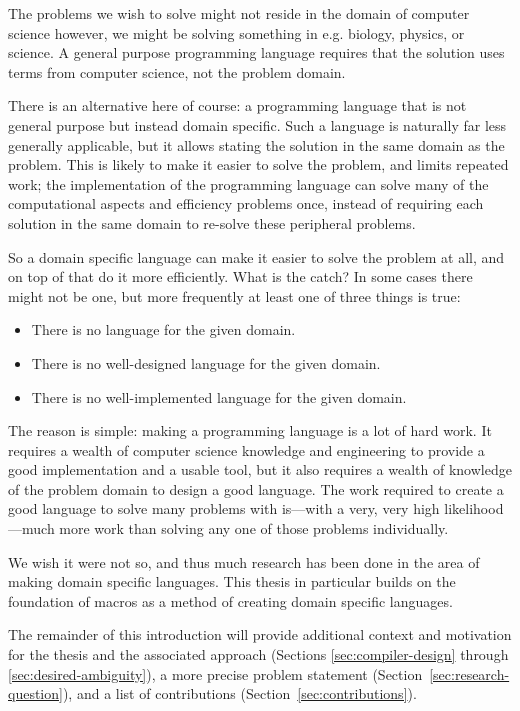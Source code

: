 \documentclass{kththesis}
\begin{document}
The problems we wish to solve might not reside in the domain of computer science however, we might be solving something in e.g. biology, physics, or science. A general purpose programming language requires that the solution uses terms from computer science, not the problem domain.

There is an alternative here of course: a programming language that is not general purpose but instead domain specific. Such a language is naturally far less generally applicable, but it allows stating the solution in the same domain as the problem. This is likely to make it easier to solve the problem, and limits repeated work; the implementation of the programming language can solve many of the computational aspects and efficiency problems once, instead of requiring each solution in the same domain to re-solve these peripheral problems.

So a domain specific language can make it easier to solve the problem at all, and on top of that do it more efficiently. What is the catch? In some cases there might not be one, but more frequently at least one of three things is true:

\begin{itemize}
  \item There is no language for the given domain.
  \item There is no well-designed language for the given domain.
  \item There is no well-implemented language for the given domain.
\end{itemize}

The reason is simple: making a programming language is a lot of hard work. It requires a wealth of computer science knowledge and engineering to provide a good implementation and a usable tool, but it also requires a wealth of knowledge of the problem domain to design a good language. The work required to create a good language to solve many problems with is---with a very, very high likelihood---much more work than solving any one of those problems individually.

We wish it were not so, and thus much research has been done in the area of making domain specific languages. This thesis in particular builds on the foundation of macros as a method of creating domain specific languages.

The remainder of this introduction will provide additional context and motivation for the thesis and the associated approach (Sections \ref{sec:compiler-design} through \ref{sec:desired-ambiguity}), a more precise problem statement (Section~\ref{sec:research-question}), and a list of contributions (Section~\ref{sec:contributions}).
\end{document}
